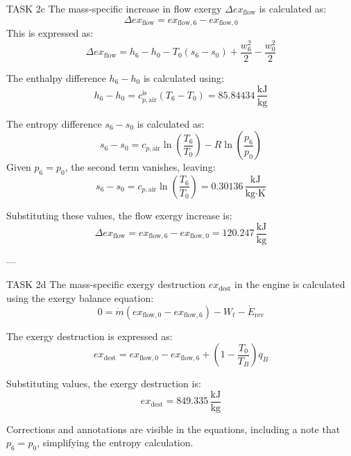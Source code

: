 TASK 2c  
The mass-specific increase in flow exergy \( \Delta ex_{\text{flow}} \) is calculated as:  
\[
\Delta ex_{\text{flow}} = ex_{\text{flow},6} - ex_{\text{flow},0}
\]  
This is expressed as:  
\[
\Delta ex_{\text{flow}} = h_6 - h_0 - T_0(s_6 - s_0) + \frac{w_6^2}{2} - \frac{w_0^2}{2}
\]  

The enthalpy difference \( h_6 - h_0 \) is calculated using:  
\[
h_6 - h_0 = c_{p,\text{air}}^{\text{is}} (T_6 - T_0) = 85.84434 \, \frac{\text{kJ}}{\text{kg}}
\]  

The entropy difference \( s_6 - s_0 \) is calculated as:  
\[
s_6 - s_0 = c_{p,\text{air}} \ln \left( \frac{T_6}{T_0} \right) - R \ln \left( \frac{p_6}{p_0} \right)
\]  
Given \( p_6 = p_0 \), the second term vanishes, leaving:  
\[
s_6 - s_0 = c_{p,\text{air}} \ln \left( \frac{T_6}{T_0} \right) = 0.30136 \, \frac{\text{kJ}}{\text{kg·K}}
\]  

Substituting these values, the flow exergy increase is:  
\[
\Delta ex_{\text{flow}} = ex_{\text{flow},6} - ex_{\text{flow},0} = 120.247 \, \frac{\text{kJ}}{\text{kg}}
\]  

---

TASK 2d  
The mass-specific exergy destruction \( ex_{\text{dest}} \) in the engine is calculated using the exergy balance equation:  
\[
0 = \dot{m} \left( ex_{\text{flow},0} - ex_{\text{flow},6} \right) - W_t - \dot{E}_{\text{rev}}
\]  

The exergy destruction is expressed as:  
\[
ex_{\text{dest}} = ex_{\text{flow},0} - ex_{\text{flow},6} + \left( 1 - \frac{T_0}{T_B} \right) q_B
\]  

Substituting values, the exergy destruction is:  
\[
ex_{\text{dest}} = 849.335 \, \frac{\text{kJ}}{\text{kg}}
\]  

Corrections and annotations are visible in the equations, including a note that \( p_6 = p_0 \), simplifying the entropy calculation.